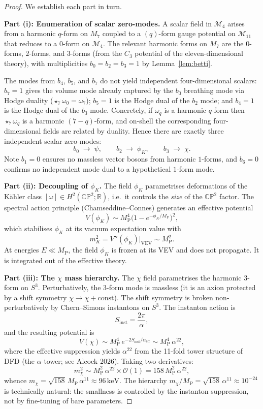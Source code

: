 \documentclass[12pt,a4paper]{article}
\theoremstyle{definition}
\theoremstyle{remark}
\newcommand{\CP}{\mathbb{CP}}
\newcommand{\MP}{M_{\mathrm{P}}}
\newcommand{\keV}{\,\mathrm{keV}}
\begin{document}
\begin{proof}
We establish each part in turn.

\medskip
\noindent\textbf{Part (i): Enumeration of scalar zero-modes.}
A scalar field in $\mathcal{M}_4$ arises from a harmonic $q$-form on
$M_7$ coupled to a $(q)$-form gauge potential on $\mathcal{M}_{11}$
that reduces to a $0$-form on $\mathcal{M}_4$.  The relevant harmonic
forms on $M_7$ are the $0$-forms, $2$-forms, and $3$-forms (from the
$C_3$ potential of the eleven-dimensional theory), with multiplicities
$b_0 = b_2 = b_3 = 1$ by Lemma~\ref{lem:betti}.

The modes from $b_4$, $b_5$, and $b_7$ do not yield independent
four-dimensional scalars: $b_7 = 1$ gives the volume mode already
captured by the $b_0$ breathing mode via Hodge duality
($\star_7 \omega_0 = \omega_7$); $b_5 = 1$ is the Hodge dual of the
$b_2$ mode; and $b_4 = 1$ is the Hodge dual of the $b_3$ mode.
Concretely, if $\omega_q$ is a harmonic $q$-form then
$\star_7 \omega_q$ is a harmonic $(7-q)$-form, and on-shell the
corresponding four-dimensional fields are related by duality.
Hence there are exactly three independent scalar zero-modes:
\[
  b_0 \;\to\; \psi, \qquad b_2 \;\to\; \phi_K, \qquad b_3 \;\to\; \chi.
\]
Note $b_1 = 0$ ensures no massless vector bosons from harmonic $1$-forms,
and $b_6 = 0$ confirms no independent mode dual to a hypothetical
$1$-form mode.

\medskip
\noindent\textbf{Part (ii): Decoupling of $\phi_K$.}
The field $\phi_K$ parametrises deformations of the K\"ahler class
$[\omega] \in H^2(\CP^2;\mathbb{R})$, i.e.\ it controls the
\emph{size} of the $\CP^2$ factor.  The spectral action principle
(Chamseddine--Connes) generates an effective potential
\[
  V(\phi_K) \sim \MP^4 \bigl(1 - e^{-\phi_K/\MP}\bigr)^2,
\]
which stabilises $\phi_K$ at its vacuum expectation value with
\[
  m_K^2 = V''(\phi_K)\big|_{\mathrm{VEV}} \sim \MP^2.
\]
At energies $E \ll \MP$, the field $\phi_K$ is frozen at its VEV
and does not propagate.  It is integrated out of the effective theory.

\medskip
\noindent\textbf{Part (iii): The $\chi$ mass hierarchy.}
The $\chi$ field parametrises the harmonic $3$-form on $S^3$.
Perturbatively, the $3$-form mode is massless (it is an axion protected
by a shift symmetry $\chi \to \chi + \mathrm{const}$).  The shift
symmetry is broken non-perturbatively by Chern--Simons instantons on
$S^3$.  The instanton action is
\[
  S_{\mathrm{inst}} = \frac{2\pi}{\alpha},
\]
and the resulting potential is
\[
  V(\chi) \sim \MP^4\, e^{-2 S_{\mathrm{inst}} / \alpha_{\mathrm{eff}}}
  \sim \MP^4\,\alpha^{22},
\]
where the effective suppression yields $\alpha^{22}$ from the 11-fold
tower structure of DFD (the $\alpha$-tower; see Alcock 2026).
Taking two derivatives:
\[
  m_\chi^2 \sim \MP^2\,\alpha^{22} \times \mathcal{O}(1)
  = 158\,\MP^2\,\alpha^{22},
\]
whence $m_\chi = \sqrt{158}\,\MP\,\alpha^{11} \approx 96\keV$.
The hierarchy $m_\chi/\MP = \sqrt{158}\,\alpha^{11} \approx 10^{-24}$
is technically natural: the smallness is controlled by the instanton
suppression, not by fine-tuning of bare parameters.


\end{proof}
\end{document}
